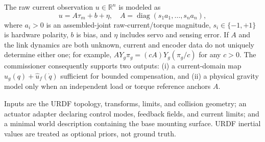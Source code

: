 \documentclass[conference]{IEEEtran}
\begin{document}
The raw current observation $u\in\mathbb R^n$ is modeled as
\begin{equation}
 u=A\tau_m+b+\eta,\quad A=\operatorname{diag}(s_1a_1,\ldots,s_na_n),
 \label{eq:current_observation}
\end{equation}
where $a_i>0$ is an assembled-joint raw-current/torque magnitude,
$s_i\in\{-1,+1\}$ is hardware polarity, $b$ is bias, and $\eta$ includes servo
and sensing error. If $A$ and the link dynamics are both unknown, current and
encoder data do not uniquely determine either one; for example,
$AY_g\pi_g=(cA)Y_g(\pi_g/c)$ for any $c>0$. The
commissioner consequently supports two outputs: (i) a current-domain map
$\hat u_g(q)+\hat u_f(\dot q)$ sufficient for bounded compensation, and (ii) a
physical gravity model only when an independent load or torque reference
anchors $A$.

Inputs are the URDF topology, transforms, limits, and collision geometry; an
actuator adapter declaring control modes, feedback fields, and current limits;
and a minimal world description containing the base mounting surface. URDF
inertial values are treated as optional priors, not ground truth.
\end{document}
